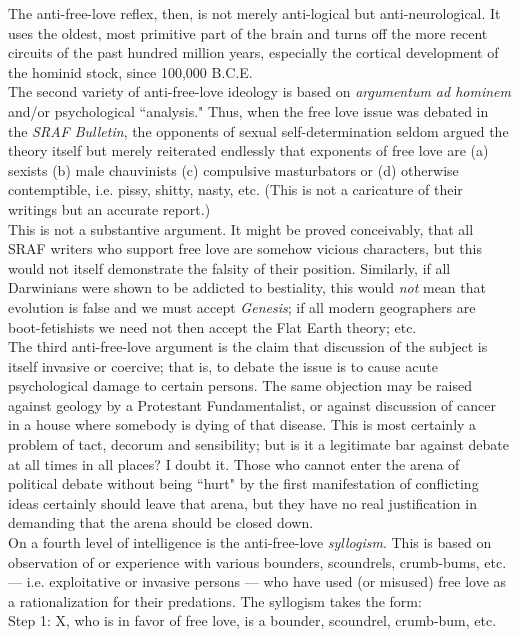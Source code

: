 The anti-free-love reflex, then, is not merely anti-logical but anti-neurological. It uses the oldest, most primitive part of the brain and turns off the more recent circuits of the past hundred million years, especially the cortical development of the hominid stock, since 100,000 B.C.E.\\
The second variety of anti-free-love ideology is based on \emph{argumentum ad hominem} and/or psychological ``analysis." Thus, when the free love issue was debated in the \emph{SRAF Bulletin}, the opponents of sexual self-determination seldom argued the theory itself but merely reiterated endlessly that exponents of free love are (a) sexists (b) male chauvinists (c) compulsive masturbators or (d) otherwise contemptible, i.e. pissy, shitty, nasty, etc. (This is not a caricature of their writings but an accurate report.)\\
This is not a substantive argument. It might be proved conceivably, that all SRAF writers who support free love are somehow vicious characters, but this would not itself demonstrate the falsity of their position. Similarly, if all Darwinians were shown to be addicted to bestiality, this would \emph{not} mean that evolution is false and we must accept \emph{Genesis}; if all modern geographers are boot-fetishists we need not then accept the Flat Earth theory; etc.\\
The third anti-free-love argument is the claim that discussion of the subject is itself invasive or coercive; that is, to debate the issue is to cause acute psychological damage to certain persons. The same objection may be raised against geology by a Protestant Fundamentalist, or against discussion of cancer in a house where somebody is dying of that disease. This is most certainly a problem of tact, decorum and sensibility; but is it a legitimate bar against debate at all times in all places? I doubt it. Those who cannot enter the arena of political debate without being ``hurt" by the first manifestation of conflicting ideas certainly should leave that arena, but they have no real justification in demanding that the arena should be closed down.\\
On a fourth level of intelligence is the anti-free-love \emph{syllogism}. This is based on observation of or experience with various bounders, scoundrels, crumb-bums, etc. --- i.e. exploitative or invasive persons --- who have used (or misused) free love as a rationalization for their predations. The syllogism takes the form:\\
\indent Step 1: X, who is in favor of free love, is a bounder, scoundrel, crumb-bum, etc.\\
